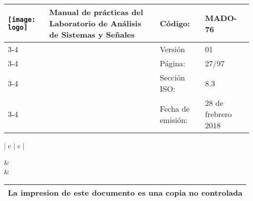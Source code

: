 \centering
\begin{tabular}{ |	p{30 mm}|	p{61 mm}	|	p{33mm}	| p{43mm}	| } 
	\hline
	
	
	\multirow{4}{30mm}{\centering \texttt{[image: logo]}} &
	\multirow{4}{61mm}{\centering \textbf{ \textbf{Manual de prácticas del Laboratorio de Análisis de Sistemas y Señales}}}    & Código: & MADO-76 \\
	\cline{3-4}
	& &  Versión & 01 \\
	\cline{3-4}
	& & Página: & 27/97 \\ \cline{3-4}
	& & Sección ISO: & 8.3 \\ \cline{3-4}
	& & Fecha de emisión: & 28 de frebrero 2018 \\
	\hline
\end{tabular}
\begin{tabular}{ |	c |	c	| } 
	
	 &
	   \\
	& \\ \hline
\end{tabular}
\begin{tabular}{|p{180mm}|}
	\multirow{1}{180mm}{ \centering La impresion de este documento es una copia no controlada }  \\ \hline \end{tabular} \\

\vspace{1cm}

